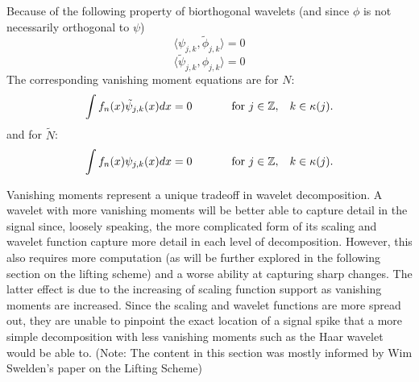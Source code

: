 \documentclass{article}
\begin{document}
Because of the following property of biorthogonal wavelets (and since \(\phi\) is not necessarily orthogonal to \(\psi\))
\[\langle \psi_{j,k}, \tilde{\phi}_{j,k}\rangle=0\]
\[\langle \tilde{\psi}_{j,k}, \phi_{j,k}\rangle=0 \]
The corresponding vanishing moment equations are for \(N\):
\[\int f_{n}(x)\tilde{\psi}_{j,k}(x)dx=0 \text{  \hspace{1cm} for }j\in\mathbb{Z},\hspace{.3cm}k\in\kappa(j).\]
and for \(\tilde{N}\):
\[\int f_{n}(x)\psi_{j,k}(x)dx=0 \text{  \hspace{1cm} for }j\in\mathbb{Z},\hspace{.3cm}k\in\kappa(j).\]

Vanishing moments represent a unique tradeoff in wavelet decomposition. A wavelet with more vanishing moments will be better able to capture detail in the signal since, loosely speaking, the more complicated form of its scaling and wavelet function capture more detail in each level of decomposition. However, this also requires more computation (as will be further explored in the following section on the lifting scheme) and a worse ability at capturing sharp changes. The latter effect is due to the increasing of scaling function support as vanishing moments are increased. Since the scaling and wavelet functions are more spread out, they are unable to pinpoint the exact location of a signal spike that a more simple decomposition with less vanishing moments such as the Haar wavelet would be able to. (Note: The content in this section was mostly informed by Wim Swelden's paper on the Lifting Scheme\cite{academicpaper1})
\end{document}
